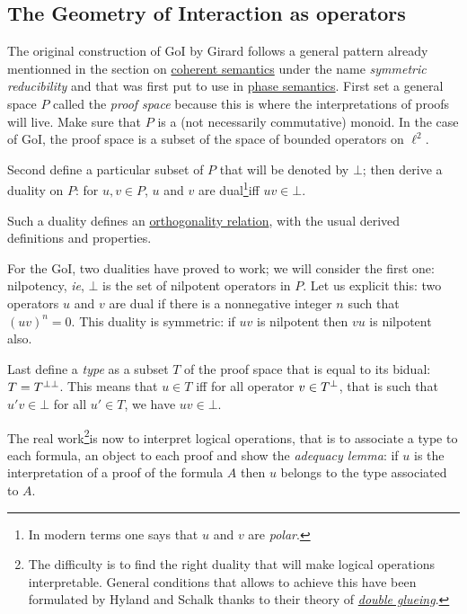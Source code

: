 \subsection{The Geometry of Interaction as operators}\label{the-geometry-of-interaction-as-operators}

The original construction of GoI by Girard follows a general pattern
already mentionned in the section on \href{coherent_semantics}{coherent
semantics} under the name \emph{symmetric reducibility} and that was
first put to use in \href{phase_semantics}{phase semantics}. First set a
general space \(P\) called the \emph{proof space} because this is where
the interpretations of proofs will live. Make sure that \(P\) is a (not
necessarily commutative) monoid. In the case of GoI, the proof space is
a subset of the space of bounded operators on \(\ell^2\).

Second define a particular subset of \(P\) that will be denoted by
\(\bot\); then derive a duality on \(P\): for \(u,v\in P\), \(u\) and
\(v\) are dual\footnote{In modern terms one says that \(u\) and \(v\)
  are \emph{polar}.}iff \(uv\in\bot\).

Such a duality defines an \href{orthogonality_relation}{orthogonality
relation}, with the usual derived definitions and properties.

For the GoI, two dualities have proved to work; we will consider the
first one: nilpotency, \emph{ie}, \(\bot\) is the set of nilpotent
operators in \(P\). Let us explicit this: two operators \(u\) and \(v\)
are dual if there is a nonnegative integer \(n\) such that
\((uv)^n = 0\). This duality is symmetric: if \(uv\) is nilpotent then
\(vu\) is nilpotent also.

Last define a \emph{type} as a subset \(T\) of the proof space that is
equal to its bidual: \(T = T^{\bot\bot}\). This means that \(u\in T\) iff
for all operator \(v\in T^\bot\), that is such that \(u'v\in\bot\) for
all \(u'\in T\), we have \(uv\in\bot\).

The real work\footnote{The difficulty is to find the right duality that
  will make logical operations interpretable. General conditions that
  allows to achieve this have been formulated by Hyland and Schalk
  thanks to their theory of \emph{\href{double_glueing}{double
  glueing}}.}is now to interpret logical operations, that is to
associate a type to each formula, an object to each proof and show the
\emph{adequacy lemma}: if \(u\) is the interpretation of a proof of the
formula \(A\) then \(u\) belongs to the type associated to \(A\).

